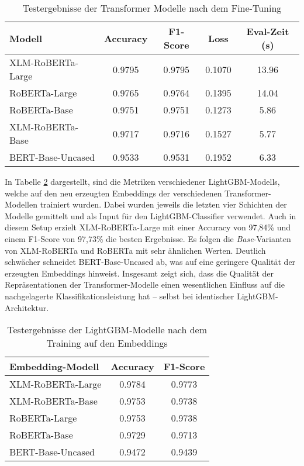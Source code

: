 \begin{table}[!ht]
\centering
\begin{tabular}{lcccc}
    \toprule
    \textbf{Modell} & \textbf{Accuracy} & \textbf{F1-Score} & \textbf{Loss} & \textbf{Eval-Zeit (s)} \\
    \midrule
    XLM-RoBERTa-Large & 0.9795 & 0.9795 & 0.1070 & 13.96 \\
    RoBERTa-Large     & 0.9765 & 0.9764 & 0.1395 & 14.04 \\
    RoBERTa-Base      & 0.9751 & 0.9751 & 0.1273 & 5.86 \\
    XLM-RoBERTa-Base  & 0.9717 & 0.9716 & 0.1527 & 5.77 \\
    BERT-Base-Uncased & 0.9533 & 0.9531 & 0.1952 & 6.33 \\
    \bottomrule
\end{tabular}
\caption{Testergebnisse der Transformer Modelle nach dem Fine-Tuning}
\label{tab:vergleich_der_transformer_modelle}
\end{table}

In Tabelle \ref{tab:vergleich_lightgbm_modelle} dargestellt, sind die Metriken verschiedener LightGBM-Modells, welche auf den neu erzeugten 
Embeddings der verschiedenen Transformer-Modellen trainiert wurden.
Dabei wurden jeweils die letzten vier Schichten der Modelle gemittelt und als Input für den LightGBM-Classifier verwendet. 
Auch in diesem Setup erzielt XLM-RoBERTa-Large mit einer Accuracy von 97,84\% und einem F1-Score von 97,73\% die besten Ergebnisse. 
Es folgen die \textit{Base}-Varianten von XLM-RoBERTa und RoBERTa mit sehr ähnlichen Werten. Deutlich schwächer schneidet BERT-Base-Uncased ab, 
was auf eine geringere Qualität der erzeugten Embeddings hinweist. Insgesamt zeigt sich, dass die Qualität der Repräsentationen der Transformer-Modelle 
einen wesentlichen Einfluss auf die nachgelagerte Klassifikationsleistung hat – selbst bei identischer LightGBM-Architektur.

\begin{table}[!ht]
\centering
\begin{tabular}{lcc}
    \toprule
    \textbf{Embedding-Modell} & \textbf{Accuracy} & \textbf{F1-Score} \\
    \midrule
    XLM-RoBERTa-Large & 0.9784 & 0.9773 \\
    XLM-RoBERTa-Base  & 0.9753 & 0.9738 \\
    RoBERTa-Large     & 0.9753 & 0.9738 \\
    RoBERTa-Base      & 0.9729 & 0.9713 \\
    BERT-Base-Uncased & 0.9472 & 0.9439 \\
    \bottomrule
\end{tabular}
\caption{Testergebnisse der LightGBM-Modelle nach dem Training auf den Embeddings}
\label{tab:vergleich_lightgbm_modelle}
\end{table}

